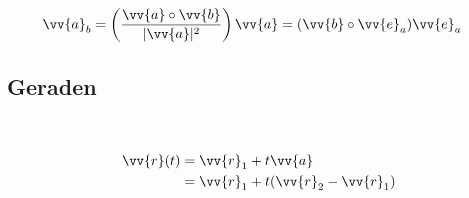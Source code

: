 \begin{boxleft}
\end{boxleft}\begin{boxrightshaded}
\begin{align} 
\vv{a}_b&=\left(\frac{\vv{a}\circ\vv{b}}{|\vv{a}|^2}\right)\vv{a}=(\vv{b}\circ\vv{e}_a)\vv{e}_a
\end{align}\end{boxrightshaded}

\subsection{Geraden}


\begin{boxleft}
\\
\end{boxleft}\begin{boxrightshaded}
\begin{align} 
\vv{r}(t) &=\vv{r}_1+t\vv{a}\\
	  &=\vv{r}_1+t(\vv{r}_2-\vv{r}_1)
\end{align}\end{boxrightshaded}
